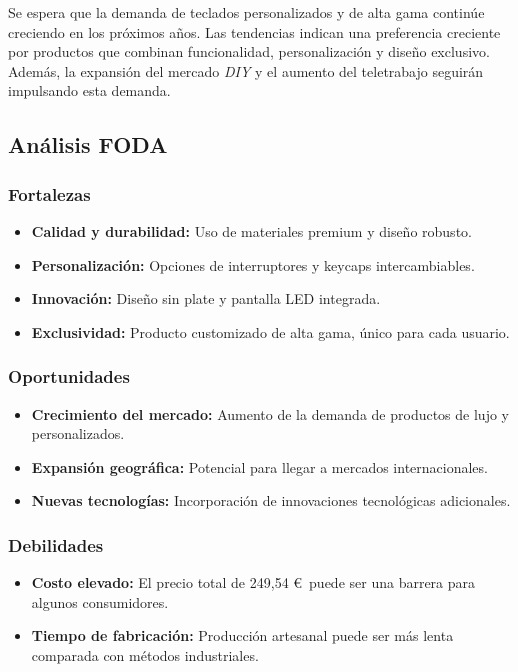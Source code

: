 Se espera que la demanda de teclados personalizados y de alta gama continúe creciendo en los próximos años. Las tendencias indican una preferencia creciente por productos que combinan funcionalidad, personalización y diseño exclusivo. Además, la expansión del mercado \textit{DIY} y el aumento del teletrabajo seguirán impulsando esta demanda.

\subsection{Análisis FODA}

\subsubsection{Fortalezas}

\begin{itemize}
    \item \textbf{Calidad y durabilidad:} Uso de materiales premium y diseño robusto.
    \item \textbf{Personalización:} Opciones de interruptores y keycaps intercambiables.
    \item \textbf{Innovación:} Diseño sin plate y pantalla LED integrada.
    \item \textbf{Exclusividad:} Producto customizado de alta gama, único para cada usuario.
\end{itemize}

\subsubsection{Oportunidades}

\begin{itemize}
    \item \textbf{Crecimiento del mercado:} Aumento de la demanda de productos de lujo y personalizados.
    \item \textbf{Expansión geográfica:} Potencial para llegar a mercados internacionales.
    \item \textbf{Nuevas tecnologías:} Incorporación de innovaciones tecnológicas adicionales.
\end{itemize}

\subsubsection{Debilidades}

\begin{itemize}
    \item \textbf{Costo elevado:} El precio total de 249,54 \euro~puede ser una barrera para algunos consumidores.
    \item \textbf{Tiempo de fabricación:} Producción artesanal puede ser más lenta comparada con métodos industriales.
\end{itemize}

